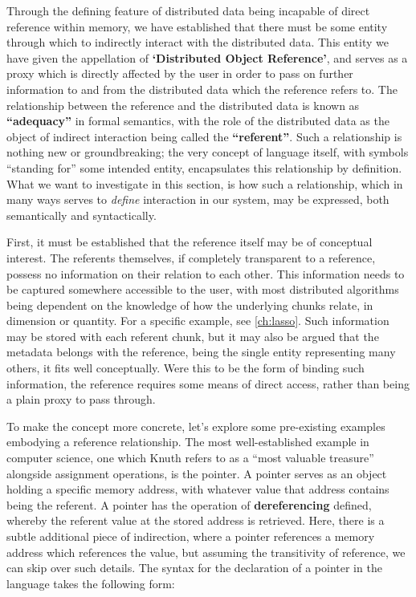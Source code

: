 Through the defining feature of distributed data being incapable of direct reference within memory, we have established that there must be some entity through which to indirectly interact with the distributed data.
This entity we have given the appellation of \textbf{`Distributed Object Reference'}, and serves as a proxy which is directly affected by the user in order to pass on further information to and from the distributed data which the reference refers to.
The relationship between the reference and the distributed data is known as \textbf{``adequacy''} in formal semantics, with the role of the distributed data as the object of indirect interaction being called the \textbf{``referent''}.
Such a relationship is nothing new or groundbreaking; the very concept of language itself, with symbols ``standing for'' some intended entity, encapsulates this relationship by definition.
What we want to investigate in this section, is how such a relationship, which in many ways serves to \emph{define} interaction in our system, may be expressed, both semantically and syntactically.

First, it must be established that the reference itself may be of conceptual interest.
The referents themselves, if completely transparent to a reference, possess no information on their relation to each other.
This information needs to be captured somewhere accessible to the user, with most distributed algorithms being dependent on the knowledge of how the underlying chunks relate, in dimension or quantity.
For a specific example, see \cref{ch:lasso}.
Such information may be stored with each referent chunk, but it may also be argued that the metadata belongs with the reference, being the single entity representing many others, it fits well conceptually.
Were this to be the form of binding such information, the reference requires some means of direct access, rather than being a plain proxy to pass through.

To make the concept more concrete, let's explore some pre-existing examples embodying a reference relationship.
The most well-established example in computer science, one which Knuth refers to as a ``most valuable treasure'' alongside assignment operations, is the pointer.
A pointer serves as an object holding a specific memory address, with whatever value that address contains being the referent.
A pointer has the operation of \textbf{dereferencing} defined, whereby the referent value at the stored address is retrieved.
Here, there is a subtle additional piece of indirection, where a pointer references a memory address which references the value, but assuming the transitivity of reference, we can skip over such details.
The syntax for the declaration of a pointer in the  language takes the following form:

